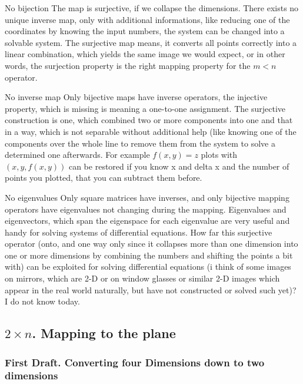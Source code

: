 \documentclass[a4paper]{article}
\begin{document}
\begin{description}
	\item{No bijection} The map is surjective, if we collapse the dimensions. There exists no unique inverse map, only with additional informations, like reducing one of the coordinates by knowing the input numbers, the system can be changed into a solvable system. The surjective map means, it converts all points correctly into a linear combination, which yields the same image we would expect, or in other words, the surjection property is the right mapping property for the $m \lt n$ operator.
	
	\item{No inverse map} Only bijective maps have inverse operators, the injective property, which is missing is meaning a one-to-one assignment. The surjective construction is one, which combined two or more components into one and that in a way, which is not separable without additional help (like knowing one of the components over the whole line to remove them from the system to solve a determined one afterwards. For example $f(x,y)=z$ plots with $(x,y,f(x,y))$ can be restored if you know x and delta x and the number of points you plotted, that you can subtract them before.

	\item{No eigenvalues} Only square matrices have inverses, and only bijective mapping operators have eigenvalues not changing during the mapping. Eigenvalues and eigenvectors, which span the eigenspace for each eigenvalue are very useful and handy for
	solving systems of differential equations. How far this surjective operator (onto, and one way only since it collapses more than one dimension into one or more dimensions by combining the numbers and shifting the points a bit with) can be exploited for solving differential equations (i think of some images on mirrors, which are 2-D or on window glasses or similar 2-D images which appear in the real world naturally, but have not constructed or solved such yet)? I do not know today.


\end{description}

\subsection{$2 \times n$. Mapping to the plane}

\subsubsection{First Draft. Converting four Dimensions down to two dimensions}\\
\end{document}
